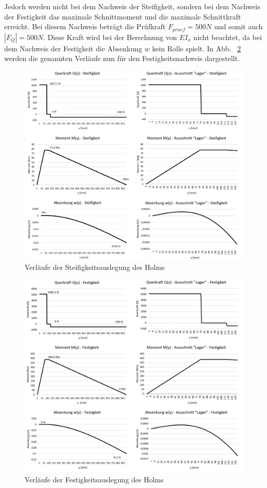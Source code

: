 \noindent Jedoch werden nicht bei dem Nachweis der Steifigkeit, sondern bei dem Nachweis der Festigkeit das maximale Schnittmoment und die maximale Schnittkraft erreicht. Bei diesem Nachweis beträgt die Prüfkraft $F_{pruef} = 500N$ und somit auch $|F_{Q}| = 500N$. Diese Kraft wird bei der Berechnung von $EI_{x}$ nicht beachtet, da bei dem Nachweis der Festigkeit die Absenkung $w$ kein Rolle spielt. In Abb. ~\ref{fig:Festigkeitsauslegung} werden die genannten Verläufe nun für den Festigkeitsnachweis dargestellt.
\FloatBarrier
\begin{figure}
	\includegraphics[width=1.0\textwidth]{Bilder/Grafiken Steifigkeit.png}
	\caption{Verläufe der Steifigkeitsauslegung des Holms}
	\label{fig:Steifigkeitsauslegung}
\end{figure}
\begin{figure}
	\includegraphics[width=1.0\textwidth]{Bilder/Grafiken Festigkeit.png}
	\caption{Verläufe der Festigkeitsauslegung des Holms}
	\label{fig:Festigkeitsauslegung}
\end{figure}


